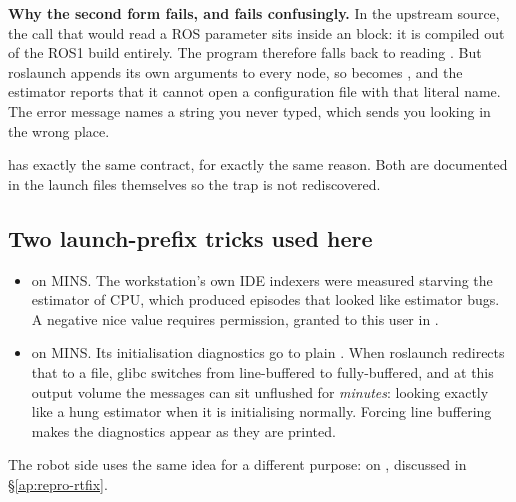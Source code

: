 \noindent \textbf{Why the second form fails, and fails confusingly.} In the
upstream source, the call that would read a  ROS parameter
sits inside an  block: it is compiled out of
the ROS1 build entirely. The program therefore falls back to reading
. But roslaunch appends its own arguments to every node, so
 becomes , and the estimator
reports that it cannot open a configuration file with that literal name. The
error message names a string you never typed, which sends you looking in the
wrong place.

\noindent {} has exactly the same contract, for exactly the same
reason. Both are documented in the launch files themselves so the trap is not
rediscovered.

\subsection{Two launch-prefix tricks used here}
\begin{itemize}[leftmargin=1.4em]
\item {} on MINS. The workstation's own IDE indexers were
  measured starving the estimator of CPU, which produced episodes that looked
  like estimator bugs. A negative nice value requires permission, granted to
  this user in .
\item {} on MINS. Its initialisation diagnostics go to plain
  . When roslaunch redirects that to a file, glibc switches from
  line-buffered to fully-buffered, and at this output volume the \code{[INIT]}
  messages can sit unflushed for \emph{minutes}: looking exactly like a
  hung estimator when it is initialising normally. Forcing line buffering makes
  the diagnostics appear as they are printed.
\end{itemize}

\noindent The robot side uses the same idea for a different purpose:
 on , discussed in
\S\ref{ap:repro-rtfix}.

